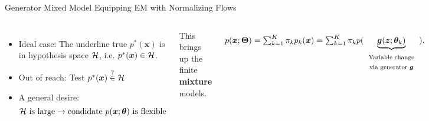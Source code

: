 \begin{frame}[label=current]{Generator Mixed Model}
  {Equipping EM with Normalizing Flows}
  \begin{columns}
    \centering
    
    
    \centering
    \begin{minipage}{\linewidth}
      
      \begin{itemize}[label=\textbullet]
      \item Ideal case: The underline true $p^{\ast}(\bm{x})$ is in hypothesis space $\mathcal{H}$, i.e. $p^{\ast}(\bm{x}) \in \mathcal{H}$.
      \item Out of reach: Test $p^{\ast}(\bm{x}) \stackrel{?}{\in} \mathcal{H}$
      \item A general desire:
        \begin{equation*}
          \mathcal{H} ~\mathrm{is~large}  \rightarrow \mathrm{condidate}~ p(\bm{x};\bm{\theta})~\mathrm{is~flexible}
        \end{equation*}
        
      \end{itemize}
      
      This brings up the finite \textbf{mixture} models.

      \begin{align*}\label{eq:FirstMixtureModel}
        p(\bm{x};\bm{\Theta})  = \textstyle\sum_{k=1}^K \pi_k  p_k(\bm{x}) = \textstyle \sum_{k=1}^K \pi_k  p(\underbrace{\bm{g}(\bm{z};\bm{\theta}_k)}_{\text{\begin{tabular}{c}Variable change \\via generator $\bm{g}$\end{tabular}}}).
      \end{align*}
      

\end{minipage}
\end{columns}
\end{frame}
